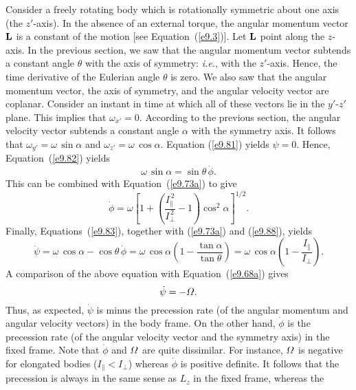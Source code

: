 Consider a freely rotating body which is rotationally symmetric about one axis (the $z'$-axis). In the absence of an external torque, the
angular momentum vector ${\bf L}$ is a constant of the motion [see Equation~(\ref{e9.3})]. Let ${\bf L}$ point along the $z$-axis. In the
previous section, we saw that the angular momentum vector subtends a
constant angle $\theta$ with the axis of symmetry: {\em i.e.}, with the $z'$-axis. Hence, the time derivative
of the Eulerian angle $\theta$ is zero. We also saw that the angular momentum
vector, the axis of symmetry, and the angular velocity vector are coplanar.
Consider an instant in time at which all of these vectors lie in the $y'$-$z'$
plane. This implies that $\omega_{x'}=0$. According to the
previous section, the angular velocity vector subtends a constant
angle $\alpha$ with the symmetry axis.  It follows that
$\omega_{y'}=\omega\,\sin\alpha$ and $\omega_{z'}=\omega\,\cos\alpha$. Equation (\ref{e9.81}) yields
$\psi=0$. Hence, Equation~(\ref{e9.82}) yields
\begin{equation}\label{e9.88}
\omega\,\sin\alpha = \sin\theta\,\dot{\phi}.
\end{equation}
This can be combined with Equation~(\ref{e9.73a}) to give
\begin{equation}\label{e9.89}
\dot{\phi} = \omega\left[1 + \left(\frac{I_\parallel^{\,2}}{I_\perp^{\,2}}-1\right)\cos^2\alpha\right]^{1/2}.
\end{equation}
Finally, Equations~(\ref{e9.83}), together with (\ref{e9.73a}) and (\ref{e9.88}),
yields
\begin{equation}
\dot{\psi} = \omega\,\cos\alpha-\cos\theta\,\dot{\phi} = \omega\,\cos\alpha\left(1-\frac{\tan\alpha}{\tan\theta}\right)=
\omega\,\cos\alpha\left(1-\frac{I_\parallel}{I_\perp}\right).
\end{equation}
A comparison of the above equation with Equation~(\ref{e9.68a}) gives
\begin{equation}
\dot{\psi}=-{\mit\Omega}.
\end{equation}
Thus, as expected, $\dot{\psi}$ is minus the precession rate (of the angular
momentum and angular velocity vectors) in the body frame. On the other hand, $\dot{\phi}$ is the precession rate (of the angular velocity vector
and the symmetry axis) in the
fixed frame. Note that $\dot{\phi}$ and ${\mit\Omega}$ are
quite dissimilar. For instance, ${\mit\Omega}$ is negative for elongated
bodies ($I_\parallel<I_\perp$) whereas $\dot{\phi}$ is positive definite. It follows that the precession is always in the
same sense as $L_z$ in the fixed frame, whereas the
